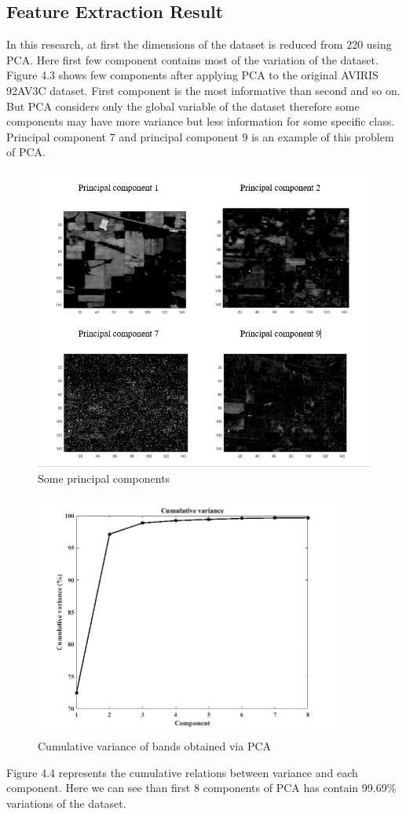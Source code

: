 \documentclass[document.tex]{subfiles}
\begin{document}
\subsection{Feature Extraction Result}
\noindent In this research, at first the dimensions of the dataset is reduced from 220 using PCA. Here first few component contains most of the variation of the dataset. Figure 4.3 shows few components after applying PCA to the original AVIRIS 92AV3C dataset. First component is the most informative than second and so on. But PCA considers only the global variable of the dataset therefore some components may have more variance but less information for some specific class. Principal component 7 and principal component 9 is an example of this problem of PCA.
\begin{figure}[H]
	\begin{center}
		\includegraphics[height=10.0cm]{imgs/PC.png}
	\end{center}
	\caption{Some principal components}
	\label{fig:Some principal components}
\end{figure}
\begin{figure}[H]
	\begin{center}
		\includegraphics[height=8.0cm]{imgs/Var.png}
	\end{center}
	\caption{Cumulative variance of bands obtained via PCA}
	\label{fig:Cumulative variance of bands obtained via PCA}
\end{figure}
\noindent Figure 4.4 represents the cumulative relations between variance and each component. Here we can see than first 8 components of PCA has contain 99.69\% variations of the dataset.
\end{document}
